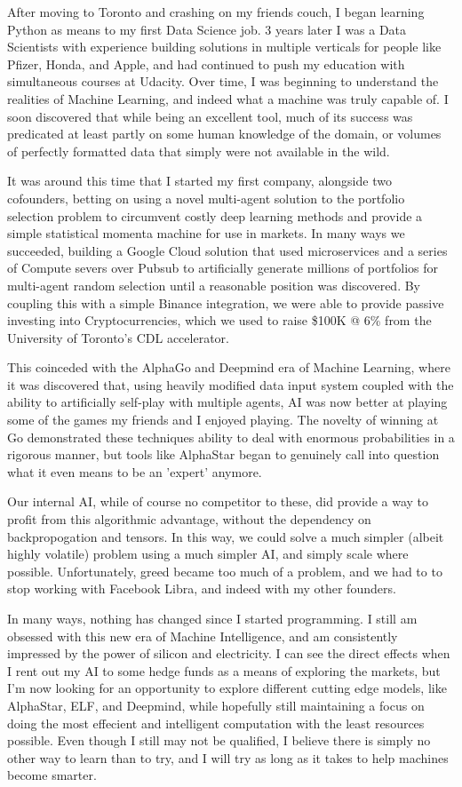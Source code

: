 \documentclass[11pt, a4paper]{awesome-cv}
\begin{document}
\begin{cvletter}
After moving to Toronto and crashing on my friends couch, I began learning
Python as means to my first Data Science job. 3 years later I was a Data
Scientists with experience building solutions in multiple verticals for people
like Pfizer, Honda, and Apple, and had continued to push my education with
simultaneous courses at Udacity. Over time, I was beginning to understand the
realities of Machine Learning, and indeed what a machine was truly capable of. I
soon discovered that while being an excellent tool, much of its success was
predicated at least partly on some human knowledge of the domain, or volumes of
perfectly formatted data that simply were not available in the wild.

It was around this time that I started my first company, alongside two
cofounders, betting on using a novel multi-agent solution to the portfolio
selection problem to circumvent costly deep learning methods and provide a
simple statistical momenta machine for use in markets. In many ways we
succeeded, building a Google Cloud solution that used microservices and a series
of Compute severs over Pubsub to artificially generate millions of portfolios
for multi-agent random selection until a reasonable position was discovered. By
coupling this with a simple Binance integration, we were able to provide passive
investing into Cryptocurrencies, which we used to raise \$100K @ 6\% from the
University of Toronto's CDL accelerator.

This coinceded with the AlphaGo and Deepmind era of Machine Learning, where it was
discovered that, using heavily modified data input system coupled with the
ability to artificially self-play with multiple agents, AI was now better
at playing some of the games my friends and I enjoyed playing. The
novelty of winning at Go demonstrated these techniques ability to deal with
enormous probabilities in a rigorous manner, but tools like AlphaStar
began to genuinely call into question what it even means to be an 'expert'
anymore.

Our internal AI, while of course no competitor to these, did provide a way to
profit from this algorithmic advantage, without the dependency on
backpropogation and tensors. In this way, we could solve a much simpler
(albeit highly volatile) problem using a much simpler AI, and simply scale where
possible. Unfortunately, greed became too much of a problem, and we had to to
stop working with Facebook Libra, and indeed with my other founders.

In many ways, nothing has changed since I started programming. I still am
obsessed with this new era of Machine Intelligence, and am consistently
impressed by the power of silicon and electricity. I can see the direct effects
when I rent out my AI to some hedge funds as a means of exploring the markets, but I'm now
looking for an opportunity to explore different cutting edge models, like
AlphaStar, ELF, and Deepmind, while hopefully still maintaining a focus on
doing the most effecient and intelligent computation with the least resources
possible. Even though I still may not be qualified, I believe there is simply no
other way to learn than to try, and I will try as long as it takes to help
machines become smarter.



\end{cvletter}
\end{document}
